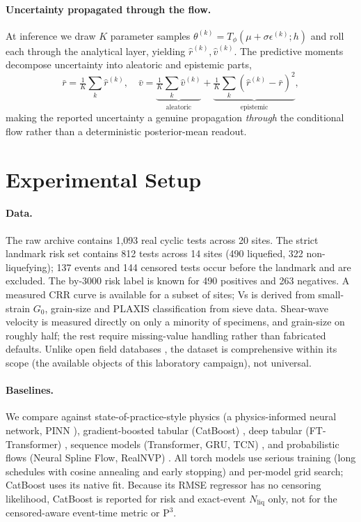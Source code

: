 \documentclass[letterpaper]{article} %
\begin{document}
\paragraph{Uncertainty propagated through the flow.} At inference we draw $K$ parameter samples
$\theta^{(k)}=T_\phi(\mu+\sigma\epsilon^{(k)};h)$ and roll each through the analytical layer, yielding
$\hat r^{(k)},\hat v^{(k)}$. The predictive moments decompose uncertainty into aleatoric and epistemic
parts,
\begin{equation}
\bar r=\tfrac1K\!\sum_k \hat r^{(k)},\quad
\bar v=\underbrace{\tfrac1K\!\sum_k \hat v^{(k)}}_{\text{aleatoric}}+\underbrace{\tfrac1K\!\sum_k(\hat r^{(k)}-\bar r)^2}_{\text{epistemic}},
\end{equation}
making the reported uncertainty a genuine propagation \emph{through} the conditional flow rather than a
deterministic posterior-mean readout.

\section{Experimental Setup}
\paragraph{Data.} The raw archive contains 1{,}093 real cyclic tests across 20 sites. The strict landmark
risk set contains 812 tests across 14 sites (490 liquefied, 322 non-liquefying); 137 events and 144 censored
tests occur before the landmark and are excluded. The by-3000 risk label is known for 490 positives and
263 negatives. A measured CRR curve is available for a subset of sites; Vs is derived from small-strain $G_0$, grain-size and
PLAXIS classification from sieve data. Shear-wave velocity is measured directly on only a minority of
specimens, and grain-size on roughly half; the rest require missing-value handling rather than fabricated
defaults. Unlike open field databases \citep{brandenberg20}, the dataset is comprehensive within its
scope (the available objects of this laboratory campaign), not universal.

\paragraph{Baselines.} We compare against state-of-practice-style physics (a physics-informed neural network, PINN
\citep{raissi19}), gradient-boosted tabular
(CatBoost) \citep{catboost18}, deep tabular (FT-Transformer) \citep{fttrans21}, sequence models
(Transformer, GRU, TCN) \citep{informer21}, and probabilistic flows (Neural Spline Flow, RealNVP)
\citep{nsf19,realnvp17}. All torch models use serious training (long schedules with cosine annealing and
early stopping) and per-model grid search; CatBoost uses its native fit.
Because its RMSE regressor has no censoring likelihood, CatBoost is reported for risk and exact-event
$N_{\mathrm{liq}}$ only, not for the censored-aware event-time metric or $\mathrm{P}^3$.
\end{document}
